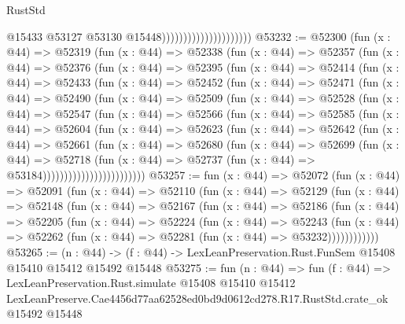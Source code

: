 \begin{lexlean}{RustStd}
\begin{coremodule}
                                              @15433
                                              @53127
                                              @53130
                                              @15448)))))))))))))))))))))
@53232 := @52300
    (fun (x : @44) =>
    @52319
      (fun (x : @44) =>
      @52338
        (fun (x : @44) =>
        @52357
          (fun (x : @44) =>
          @52376
            (fun (x : @44) =>
            @52395
              (fun (x : @44) =>
              @52414
                (fun (x : @44) =>
                @52433
                  (fun (x : @44) =>
                  @52452
                    (fun (x : @44) =>
                    @52471
                      (fun (x : @44) =>
                      @52490
                        (fun (x : @44) =>
                        @52509
                          (fun (x : @44) =>
                          @52528
                            (fun (x : @44) =>
                            @52547
                              (fun (x : @44) =>
                              @52566
                                (fun (x : @44) =>
                                @52585
                                  (fun (x : @44) =>
                                  @52604
                                    (fun (x : @44) =>
                                    @52623
                                      (fun (x : @44) =>
                                      @52642
                                        (fun (x : @44) =>
                                        @52661
                                          (fun (x : @44) =>
                                          @52680
                                            (fun (x : @44) =>
                                            @52699
                                              (fun (x : @44) =>
                                              @52718
                                                (fun (x : @44) =>
                                                @52737
                                                  (fun (x : @44) => @53184))))))))))))))))))))))))
@53257 := fun (x : @44) =>
  @52072
    (fun (x : @44) =>
    @52091
      (fun (x : @44) =>
      @52110
        (fun (x : @44) =>
        @52129
          (fun (x : @44) =>
          @52148
            (fun (x : @44) =>
            @52167
              (fun (x : @44) =>
              @52186
                (fun (x : @44) =>
                @52205
                  (fun (x : @44) =>
                  @52224
                    (fun (x : @44) =>
                    @52243
                      (fun (x : @44) =>
                      @52262 (fun (x : @44) => @52281 (fun (x : @44) => @53232))))))))))))
@53265 := (n : @44) ->
  (f : @44) -> LexLeanPreservation.Rust.FunSem @15408 @15410 @15412 @15492 @15448
@53275 := fun (n : @44) =>
  fun (f : @44) =>
  LexLeanPreservation.Rust.simulate
    @15408
    @15410
    @15412
    LexLeanPreserve.Cae4456d77aa62528ed0bd9d0612cd278.R17.RustStd.crate_ok
    @15492
    @15448
\end{coremodule}
\end{lexlean}

